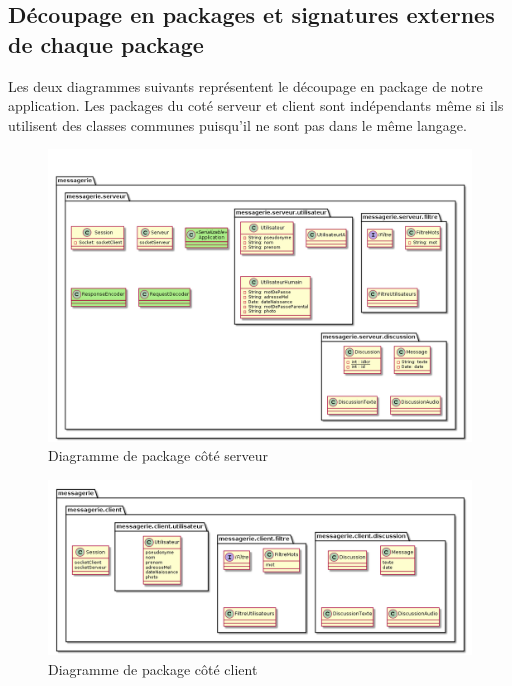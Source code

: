 	\newpage

	\subsection{Découpage en packages et signatures externes de chaque package}
	Les deux diagrammes suivants représentent le découpage en package de notre application.
	Les packages du coté serveur et client sont indépendants même si ils utilisent des classes communes puisqu'il ne sont pas dans le même langage.

	\begin{figure}[H]
	\centerline{\includegraphics[width=16.5cm]{img/packageServeurV2.png}}
		\caption{Diagramme de package côté serveur}
	\end{figure}

	\begin{figure}[H]
	\centerline{\includegraphics[width=16.5cm]{img/packageClient.png}}
	\caption{Diagramme de package côté client}
	\end{figure}
